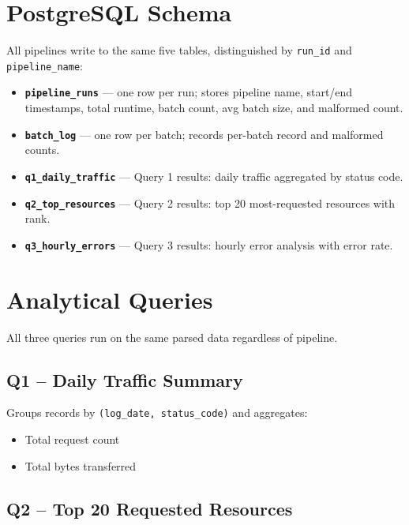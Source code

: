 \documentclass[12pt,a4paper]{article}
\begin{document}
\section{PostgreSQL Schema}

All pipelines write to the same five tables, distinguished by \texttt{run\_id} and
\texttt{pipeline\_name}:

\begin{itemize}
  \item \textbf{\texttt{pipeline\_runs}} --- one row per run; stores pipeline name, start/end
        timestamps, total runtime, batch count, avg batch size, and malformed count.
  \item \textbf{\texttt{batch\_log}} --- one row per batch; records per-batch record and malformed
        counts.
  \item \textbf{\texttt{q1\_daily\_traffic}} --- Query 1 results: daily traffic aggregated by
        status code.
  \item \textbf{\texttt{q2\_top\_resources}} --- Query 2 results: top 20 most-requested resources
        with rank.
  \item \textbf{\texttt{q3\_hourly\_errors}} --- Query 3 results: hourly error analysis with error
        rate.
\end{itemize}

\section{Analytical Queries}

All three queries run on the same parsed data regardless of pipeline.

\subsection{Q1 -- Daily Traffic Summary}

Groups records by \texttt{(log\_date, status\_code)} and aggregates:
\begin{itemize}
  \item Total request count
  \item Total bytes transferred
\end{itemize}

\subsection{Q2 -- Top 20 Requested Resources}
\end{document}
